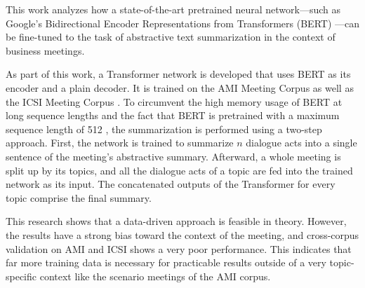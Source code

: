 This work analyzes how a state-of-the-art pretrained neural network---such as Google's Bidirectional Encoder Representations from Transformers (BERT) \cite{devlin2018bert}---can be fine-tuned to the task of abstractive text summarization in the context of business meetings. %

As part of this work, a Transformer network \cite{1706.03762} is developed that uses BERT as its encoder and a plain decoder.
It is trained on the AMI Meeting Corpus \cite{Mccowan05theami} as well as the ICSI Meeting Corpus \cite{Janin}.
To circumvent the high memory usage of BERT at long sequence lengths and the fact that BERT is pretrained with a maximum sequence length of 512 \cite[p.~13]{devlin2018bert}, the summarization is performed using a two-step approach.
First, the network is trained to summarize \(n\) dialogue acts into a single sentence of the meeting's abstractive summary.
Afterward, a whole meeting is split up by its topics, and all the dialogue acts of a topic are fed into the trained network as its input.
The concatenated outputs of the Transformer for every topic comprise the final summary.

This research shows that a data-driven approach is feasible in theory.
However, the results have a strong bias toward the context of the meeting, and cross-corpus validation on AMI and ICSI shows a very poor performance.
This indicates that far more training data is necessary for practicable results outside of a very topic-specific context like the scenario meetings of the AMI corpus. 
